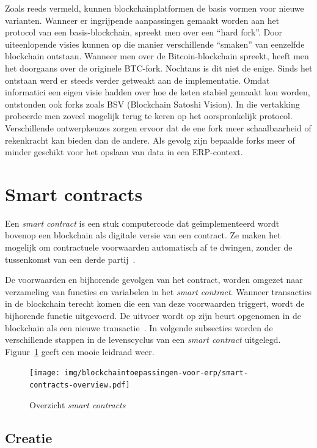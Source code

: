 Zoals reeds vermeld, kunnen blockchainplatformen de basis vormen voor nieuwe varianten. Wanneer er ingrijpende aanpassingen gemaakt worden aan het protocol van een basis-blockchain, spreekt men over een ``hard fork''. Door uiteenlopende visies kunnen op die manier verschillende ``smaken'' van eenzelfde blockchain ontstaan. Wanneer men over de Bitcoin-blockchain spreekt, heeft men het doorgaans over de originele BTC-fork. Nochtans is dit niet de enige. Sinds het ontstaan werd er steeds verder getweakt aan de implementatie. Omdat informatici een eigen visie hadden over hoe de keten stabiel gemaakt kon worden, ontstonden ook forks zoals BSV (Blockchain Satoshi Vision). In die vertakking probeerde men zoveel mogelijk terug te keren op het oorspronkelijk protocol. Verschillende ontwerpkeuzes zorgen ervoor dat de ene fork meer schaalbaarheid of rekenkracht kan bieden dan de andere. Als gevolg zijn bepaalde forks meer of minder geschikt voor het opslaan van data in een ERP-context.

\section{Smart contracts}

Een \textit{smart contract} is een stuk computercode dat geïmplementeerd wordt bovenop een blockchain als digitale versie van een contract. Ze maken het mogelijk om contractuele voorwaarden automatisch af te dwingen, zonder de tussenkomst van een derde partij~\autocite{Salem2008}.

De voorwaarden en bijhorende gevolgen van het contract, worden omgezet naar verzameling van functies en variabelen in het \textit{smart contract}. Wanneer transacties in de blockchain terecht komen die een van deze voorwaarden triggert, wordt de bijhorende functie uitgevoerd. De uitvoer wordt op zijn beurt opgenomen in de blockchain als een nieuwe transactie~\autocite{Zheng2019}. In volgende subsecties worden de verschillende stappen in de levenscyclus van een \textit{smart contract} uitgelegd. Figuur~\ref{fig:smart-contracts-overview} geeft een mooie leidraad weer.

\begin{figure}[]
	\centering
	\texttt{[image: img/blockchaintoepassingen-voor-erp/smart-contracts-overview.pdf]}
	\caption{\label{fig:smart-contracts-overview}Overzicht \textit{smart contracts}~\autocite{Zheng2019}}
\end{figure}

\subsection{Creatie}

